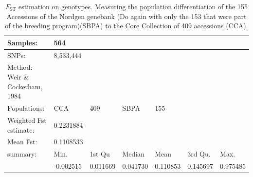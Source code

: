\documentclass[9pt, twocolumn,twoside]{gsajnl}
\begin{document}
\begin{table}[p]
\centering 
\caption{$F_{\text{ST}}$ estimation on genotypes. Measuring the population differentiation of  the 155 Accessions of the Nordgen genebank (Do again with only the 153 that were part of the breeding program)(SBPA) to the Core Collection of 409 accessions (CCA).}

\begin{tableminipage}{\textwidth}
\begin{tabular}{|l|l|l|l|l|l|l|}
\hline

Samples:                        &564        &          &          &          &          &          \\ \hline
SNPs:                           & 8,533,444 &          &          &          &          &          \\ \hline
Method: Weir \& Cockerham, 1984 &           &          &          &          &          &          \\ \hline
Populations:                  & CCA       & 409      & SBPA     & 155      &          &          \\ \hline
Weighted Fst estimate:          &0.2231884  &          &          &          &          &          \\ \hline
Mean Fst:                       &0.1108533  &          &          &          &          &          \\ \hline
summary:                        & Min.      & 1st Qu   & Median   & Mean     & 3rd Qu.  & Max.     \\ \hline
                                & -0.002515 & 0.011669 & 0.041730 & 0.110853 & 0.145697 & 0.975485 \\ \hline
\end{tabular}
  \label{tab:fst}
\end{tableminipage}
\end{table}
\end{document}
